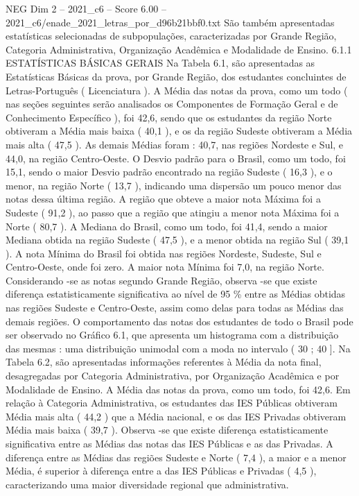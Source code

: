 \begin{textsample}{NEG Dim 2 – 2021\_c6 – Score 6.00 – 2021\_c6/enade\_2021\_letras\_por\_d96b21bbf0.txt}
São também apresentadas estatísticas selecionadas de subpopulações, caracterizadas por Grande Região, Categoria Administrativa, Organização Acadêmica e Modalidade de Ensino. 6.1.1 ESTATÍSTICAS BÁSICAS GERAIS Na Tabela 6.1, são apresentadas as Estatísticas Básicas da prova, por Grande Região, dos estudantes concluintes de Letras-Português ( Licenciatura ).
A Média das notas da prova, como um todo ( nas seções seguintes serão analisados os Componentes de Formação Geral e de Conhecimento Específico ), foi 42,6, sendo que os estudantes da região Norte obtiveram a Média mais baixa ( 40,1 ), e os da região Sudeste obtiveram a Média mais alta ( 47,5 ).
As demais Médias foram : 40,7, nas regiões Nordeste e Sul, e 44,0, na região Centro-Oeste.
O Desvio padrão para o Brasil, como um todo, foi 15,1, sendo o maior Desvio padrão encontrado na região Sudeste ( 16,3 ), e o menor, na região Norte ( 13,7 ), indicando uma dispersão um pouco menor das notas dessa última região.
A região que obteve a maior nota Máxima foi a Sudeste ( 91,2 ), ao passo que a região que atingiu a menor nota Máxima foi a Norte ( 80,7 ).
A Mediana do Brasil, como um todo, foi 41,4, sendo a maior Mediana obtida na região Sudeste ( 47,5 ), e a menor obtida na região Sul ( 39,1 ).
A nota Mínima do Brasil foi obtida nas regiões Nordeste, Sudeste, Sul e Centro-Oeste, onde foi zero.
A maior nota Mínima foi 7,0, na região Norte.
Considerando -se as notas segundo Grande Região, observa -se que existe diferença estatisticamente significativa ao nível de 95 \% entre as Médias obtidas nas regiões Sudeste e Centro-Oeste, assim como delas para todas as Médias das demais regiões.
O comportamento das notas dos estudantes de todo o Brasil pode ser observado no Gráfico 6.1, que apresenta um histograma com a distribuição das mesmas : uma distribuição unimodal com a moda no intervalo ( 30 ; 40 ].
Na Tabela 6.2, são apresentadas informações referentes à Média da nota final, desagregadas por Categoria Administrativa, por Organização Acadêmica e por Modalidade de Ensino.
A Média das notas da prova, como um todo, foi 42,6.
Em relação à Categoria Administrativa, os estudantes das IES Públicas obtiveram Média mais alta ( 44,2 ) que a Média nacional, e os das IES Privadas obtiveram Média mais baixa ( 39,7 ).
Observa -se que existe diferença estatisticamente significativa entre as Médias das notas das IES Públicas e as das Privadas.
A diferença entre as Médias das regiões Sudeste e Norte ( 7,4 ), a maior e a menor Média, é superior à diferença entre a das IES Públicas e Privadas ( 4,5 ), caracterizando uma maior diversidade regional que administrativa.

\end{textsample}
